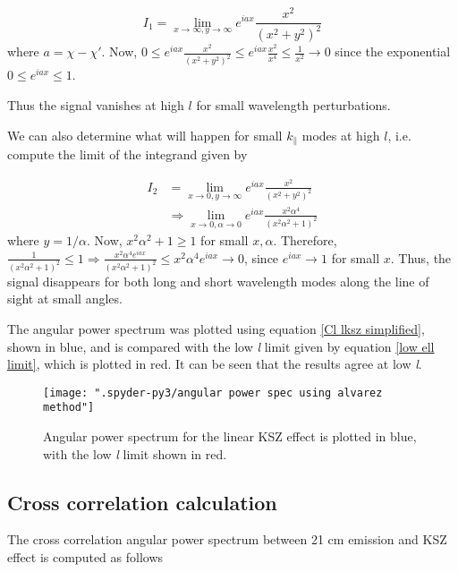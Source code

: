 \documentclass[12pt]{article}
\begin{document}
\begin{itemize}
\begin{equation}
I_1=\lim_{x \to \infty, y \to \infty} e^{iax} \frac{x^2}{(x^2+y^2)^2}
\end{equation}
where $a=\chi-\chi'$. Now, $0\leq e^{iax} \frac{x^2}{(x^2+y^2)^2} \leq e^{iax} \frac{x^2}{x^4}\leq\frac{1}{x^2} \rightarrow 0$ since the exponential\\ $0\leq e^{iax}\leq 1$.

Thus the signal vanishes at high $l$ for small wavelength perturbations.

We can also determine what will happen for small $k_\parallel$ modes at high $l$, i.e. compute the limit of the integrand given by

\begin{equation}
\begin{aligned}
I_2&=\lim_{x \to 0, y \to \infty} e^{iax} \frac{x^2}{(x^2+y^2)^2}\\ &\Rightarrow \lim_{x \to 0, \alpha \to 0} e^{iax} \frac{x^2\alpha ^4}{(x^2\alpha ^2+1)^2}
\end{aligned}
\end{equation}
 where $y=1/\alpha$. Now, $x^2\alpha ^2+1\geq 1$ for small $x,\alpha $. Therefore, $\frac{1}{(x^2\alpha ^2+1)^2} \leq 1 \Rightarrow \frac{x^2\alpha ^4e^{iax}}{(x^2\alpha ^2+1)^2} \leq x^2\alpha ^4e^{iax}\rightarrow 0$, since $e^{iax}\rightarrow 1$ for small $x$.
 Thus, the signal disappears for both long and short wavelength modes along the line of sight at small angles.
\end{itemize}
The angular power spectrum was plotted using equation \ref{Cl lksz simplified}, shown in blue, and is compared with the low \textit{l} limit given by equation \ref{low ell limit}, which is plotted in red. It can be seen that the results agree at low \textit{l}.
\begin{figure}[h!]
	\centering
	\texttt{[image: ".spyder-py3/angular power spec using alvarez method"]}
	\caption{Angular power spectrum for the linear KSZ effect is plotted in blue, with the low \textit{l} limit shown in red.}
	\label{fig:angular-power-spec-using-alvarez-method}
\end{figure}



\subsection{Cross correlation calculation}

The cross correlation angular power spectrum between 21 cm emission and KSZ effect is computed as follows
\end{document}
